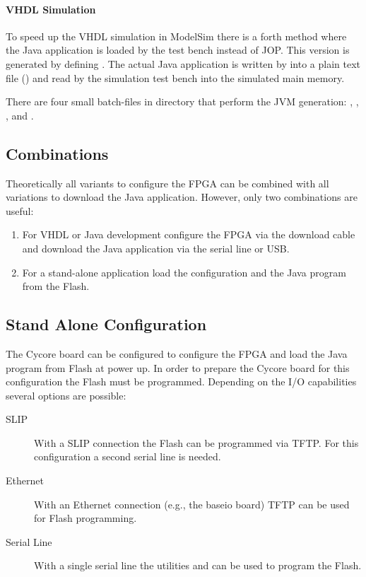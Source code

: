 \paragraph{VHDL Simulation}

To speed up the VHDL simulation in ModelSim
there is a forth method where the Java application is loaded by the
test bench instead of JOP. This version is generated by defining
. The actual Java application is written by
 into a plain text file () and read
by the simulation test bench into the simulated main memory.

There are four small batch-files in directory  that
perform the JVM generation: , ,
, and .

\subsection{Combinations}

Theoretically all variants to configure the FPGA can be combined with
all variations to download the Java application. However, only two
combinations are useful:

\begin{enumerate}
    \item For VHDL or Java development configure the FPGA
    via the download cable and download the Java application
    via the serial line or USB.
    \item For a stand-alone application load the configuration and
    the Java program from the Flash.
\end{enumerate}

\subsection{Stand Alone Configuration}

The Cycore board can be configured to configure the FPGA and load the
Java program from Flash at power up. In order to prepare the Cycore
board for this configuration the Flash must be programmed. Depending
on the I/O capabilities several options are possible:

\begin{description}
  \item[SLIP] With a SLIP connection the Flash can be programmed
      via TFTP. For this configuration a second serial line is
      needed.
  \item[Ethernet] With an Ethernet connection (e.g., the baseio
      board) TFTP can be used for Flash programming.
  \item[Serial Line] With a single serial line the utilities
       and  can be used to
      program the Flash.
\end{description}

